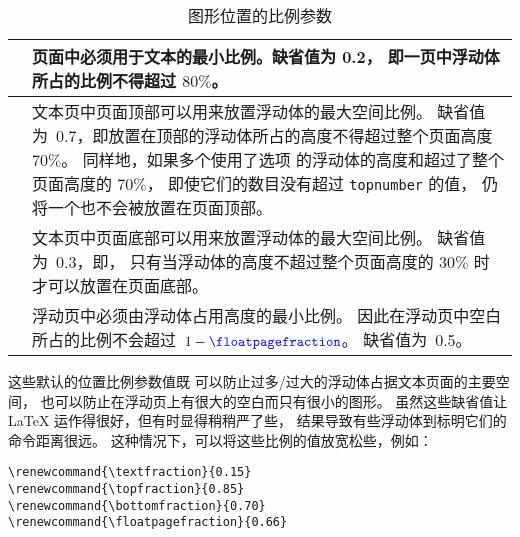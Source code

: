 \begin{table}[hbp]
	\centering\kaishu
	\caption{图形位置的比例参数}\label{tab:floatfraction}
	\begin{tabular}{ l P{0.7\textwidth}}
		\toprule
		 & 页面中必须用于文本的最小比例。缺省值为 0.2，
		即一页中浮动体所占的比例不得超过 $80\percent$。 \\
		\hline
		 &  文本页中页面顶部可以用来放置浮动体的最大空间比例。
		缺省值为~0.7，即放置在顶部的浮动体所占的高度不得超过整个页面高度 $70\percent$。
		同样地，如果多个使用了选项  的浮动体的高度和超过了整个页面高度的 $70\percent$，
		即使它们的数目没有超过 \texttt{topnumber} 的值，
		仍将一个也不会被放置在页面顶部。 \\
		\hline
		 & 文本页中页面底部可以用来放置浮动体的最大空间比例。
		缺省值为~0.3，即，
		只有当浮动体的高度不超过整个页面高度的 $30\percent$ 时才可以放置在页面底部。\\
		 & 浮动页中必须由浮动体占用高度的最小比例。
		因此在浮动页中空白所占的比例不会超过~$1-\text{{\textcolor{blue}{\texttt{\textbackslash floatpagefraction}}}}$。
		缺省值为~0.5。\\
		\bottomrule
	\end{tabular}
\end{table}

这些默认的位置比例参数值既
可以防止过多/过大的浮动体占据文本页面的主要空间，
也可以防止在浮动页上有很大的空白而只有很小的图形。
虽然这些缺省值让 \LaTeX{} 运作得很好，但有时显得稍稍严了些，
结果导致有些浮动体到标明它们的命令距离很远。
这种情况下，可以将这些比例的值放宽松些，例如：
\begin{lstlisting}
\renewcommand{\textfraction}{0.15} 
\renewcommand{\topfraction}{0.85} 
\renewcommand{\bottomfraction}{0.70} 
\renewcommand{\floatpagefraction}{0.66}
\end{lstlisting}

